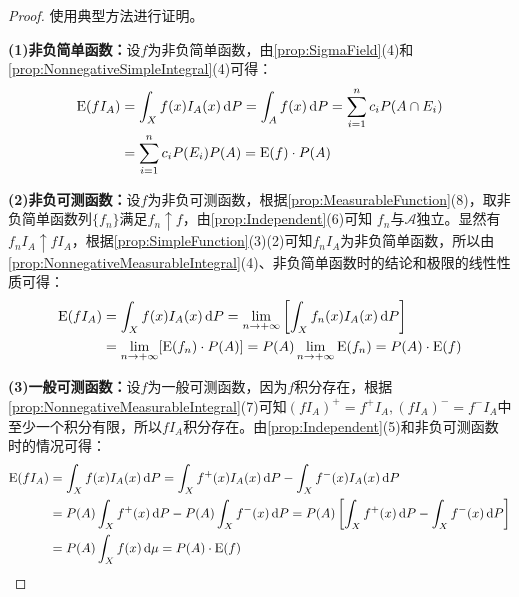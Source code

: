 \begin{proof}
	使用典型方法进行证明。\par
	\textbf{(1)非负简单函数：}设$f$为非负简单函数，由\cref{prop:SigmaField}(4)和\cref{prop:NonnegativeSimpleIntegral}(4)可得：
	\begin{align*}
		\operatorname{E}(fI_A)&=\int_{X}f(x)I_A(x)\mathop{}\!\mathrm{d} P=\int_{A}f(x)\mathop{}\!\mathrm{d} P=\sum_{i=1}^{n}c_iP(A\cap E_i) \\
		&=\sum_{i=1}^{n}c_iP(E_i)P(A)=\operatorname{E}(f)\cdot P(A)
	\end{align*}\par
	\textbf{(2)非负可测函数：}设$f$为非负可测函数，根据\cref{prop:MeasurableFunction}(8)，取非负简单函数列$\{f_n\}$满足$f_n\uparrow f$，由\cref{prop:Independent}(6)可知 $f_n$与$\mathscr{A}$独立。显然有$f_nI_A\uparrow fI_A$，根据\cref{prop:SimpleFunction}(3)(2)可知$f_nI_A$为非负简单函数，所以由\cref{prop:NonnegativeMeasurableIntegral}(4)、非负简单函数时的结论和极限的线性性质可得：
	\begin{align*}
		\operatorname{E}(fI_A)&=\int_{X}f(x)I_A(x)\mathop{}\!\mathrm{d} P=\lim_{n\to+\infty}\left[\int_{X}f_n(x)I_A(x)\mathop{}\!\mathrm{d} P\right] \\
		&=\lim_{n\to+\infty}[\operatorname{E}(f_n)\cdot P(A)]=P(A)\lim_{n\to+\infty}\operatorname{E}(f_n)=P(A)\cdot\operatorname{E}(f)
	\end{align*}\par
	\textbf{(3)一般可测函数：}设$f$为一般可测函数，因为$f$积分存在，根据\cref{prop:NonnegativeMeasurableIntegral}(7)可知$(fI_A)^+=f^+I_A,(fI_A)^-=f^-I_A$中至少一个积分有限，所以$fI_A$积分存在。由\cref{prop:Independent}(5)和非负可测函数时的情况可得：
	\begin{align*}
		\operatorname{E}(fI_A)&=\int_{X}f(x)I_A(x)\dif P=\int_{X}f^+(x)I_A(x)\dif P-\int_{X}f^-(x)I_A(x)\dif P \\
		&=P(A)\int_{X}f^+(x)\dif P-P(A)\int_{X}f^-(x)\dif P=P(A)\left[\int_{X}f^+(x)\dif P-\int_{X}f^-(x)\dif P\right] \\
		&=P(A)\int_{X}f(x)\dif\mu=P(A)\cdot\operatorname{E}(f)\qedhere
	\end{align*}
\end{proof}
